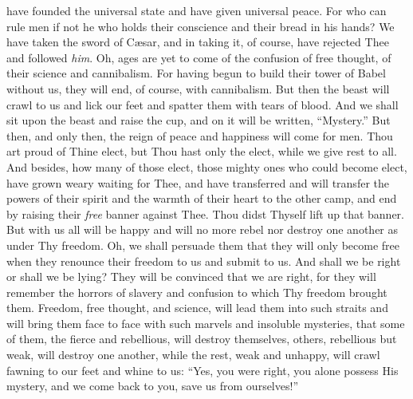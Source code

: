 have founded the universal state and have given universal peace. For
who can rule men if not he who holds their conscience and their bread
in his hands? We have taken the sword of C\ae sar, and in taking it,
of course, have rejected Thee and followed \textit{him}. Oh, ages are
yet to come of the confusion of free thought, of their science and
cannibalism. For having begun to build their tower of Babel without
us, they will end, of course, with cannibalism. But then the beast
will crawl to us and lick our feet and spatter them with tears of
blood. And we shall sit upon the beast and raise the cup, and on it
will be written, ``Mystery.'' But then, and only then, the reign of
peace and happiness will come for men. Thou art proud of Thine elect,
but Thou hast only the elect, while we give rest to all. And besides,
how many of those elect, those mighty ones who could become elect,
have grown weary waiting for Thee, and have transferred and will
transfer the powers of their spirit and the warmth of their heart to
the other camp, and end by raising their \textit{free} banner against
Thee. Thou didst Thyself lift up that banner. But with us all will be
happy and will no more rebel nor destroy one another as under Thy
freedom. Oh, we shall persuade them that they will only become free
when they renounce their freedom to us and submit to us. And shall we
be right or shall we be lying? They will be convinced that we are
right, for they will remember the horrors of slavery and confusion to
which Thy freedom brought them. Freedom, free thought, and science,
will lead them into such straits and will bring them face to face with
such marvels and insoluble mysteries, that some of them, the fierce
and rebellious, will destroy themselves, others, rebellious but weak,
will destroy one another, while the rest, weak and unhappy, will crawl
fawning to our feet and whine to us: ``Yes, you were right, you alone
possess His mystery, and we come back to you, save us from
ourselves!''

